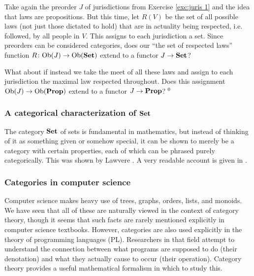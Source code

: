 \begin{exercise}\label{exc:juris 2}
Take again the preorder $J$ of jurisdictions from Exercise \ref{exc:juris 1} and the idea that laws are propositions. But this time, let $R(V)$ be the set of all possible laws (not just those dictated to hold) that are in actuality being respected, i.e. followed, by all people in $V$. This assigns to each jurisdiction a set.
\sexc Since preorders can be considered categories, does our “the set of respected laws” function $R\colon\textnormal{Ob}(J)\rightarrow\textnormal{Ob}({\bf Set})$ extend to a functor $J\rightarrow{\bf Set}$? 
\item What about if instead we take the meet of all these laws and assign to each jurisdiction the maximal law respected throughout. Does this assignment $\textnormal{Ob}(J)\rightarrow\textnormal{Ob}({\bf Prop})$ extend to a functor $J\rightarrow{\bf Prop}$?$~^{\arabic{footnote}}$
\endsexc
\end{exercise}


\subsubsection{A categorical characterization of ${\bf Set}$}
The category ${\bf Set}$ of sets is fundamental in mathematics, but instead of thinking of it as something given or somehow special, it can be shown to merely be a category with certain properties, each of which can be phrased purely categorically. This was shown by Lawvere \cite{Law}. A very readable account is given in \cite{Le2}.


\subsubsection{Categories in computer science}

Computer science makes heavy use of trees, graphs, orders, lists, and monoids. We have seen that all of these are naturally viewed in the context of category theory, though it seems that such facts are rarely mentioned explicitly in computer science textbooks. However, categories are also used explicitly in the theory of programming languages (PL). Researchers in that field attempt to understand the connection between what programs are supposed to do (their denotation) and what they actually cause to occur (their operation). Category theory provides a useful mathematical formalism in which to study this.

